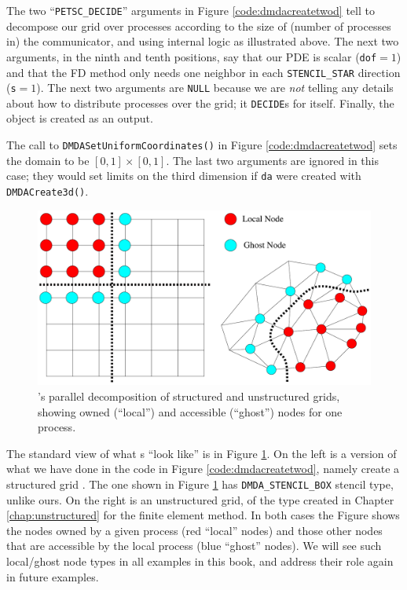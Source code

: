 The two ``\texttt{PETSC\_DECIDE}'' arguments in Figure \ref{code:dmdacreatetwod} tell \PETSc to decompose our grid over \MPI processes according to the size of (number of processes in) the \MPI communicator, and using \PETSc internal logic as illustrated above.  The next two arguments, in the ninth and tenth positions, say that our PDE is scalar (\texttt{dof}$=1$) and that the FD method only needs one neighbor in each \texttt{STENCIL\_STAR} direction (\texttt{s}$=1$).  The next two arguments are \texttt{NULL} because we are \emph{not} telling \PETSc any details about how to distribute processes over the grid; it \texttt{DECIDE}s for itself.  Finally, the \pDMDA object is created as an output.

The call to \texttt{DMDASetUniformCoordinates()} in Figure \ref{code:dmdacreatetwod} sets the domain to be $[0,1]\times[0,1]$.  The last two arguments are ignored in this case; they would set limits on the third dimension if \texttt{da} were created with \texttt{DMDACreate3d()}.

\begin{figure}
\includegraphics[width=\textwidth]{petscghostvalues}
\caption{\PETSc's parallel decomposition of structured and unstructured grids, showing owned (``local'') and accessible (``ghost'') nodes for one process.}
\label{fig:petscghostvalues}
\end{figure}

The standard \PETSc view of what \pDM s ``look like'' is in Figure \ref{fig:petscghostvalues}.  On the left is a version of what we have done in the code in Figure \ref{code:dmdacreatetwod}, namely create a structured grid \pDM.  The one shown in Figure \ref{fig:petscghostvalues} has \texttt{DMDA\_STENCIL\_BOX} stencil type, unlike ours.  On the right is an unstructured grid, of the type created in Chapter \ref{chap:unstructured} for the finite element method.  In both cases the Figure shows the nodes owned by a given process (red ``local'' nodes) and those other nodes that are accessible by the local process (blue ``ghost'' nodes).  We will see such local/ghost node types in all examples in this book, and address their role again in future examples.


